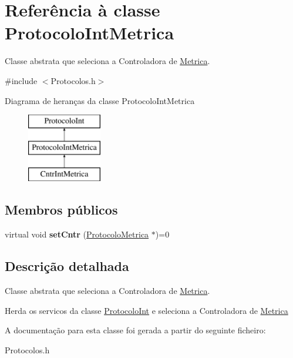 \hypertarget{class_protocolo_int_metrica}{
\section{\-Referência à classe \-Protocolo\-Int\-Metrica}
\label{class_protocolo_int_metrica}
}


\-Classe abstrata que seleciona a \-Controladora de \hyperlink{class_metrica}{\-Metrica}.  




{\ttfamily \#include $<$\-Protocolos.\-h$>$}

\-Diagrama de heranças da classe \-Protocolo\-Int\-Metrica\begin{figure}[H]
\begin{center}
\leavevmode
\includegraphics[height=3.000000cm]{class_protocolo_int_metrica}
\end{center}
\end{figure}
\subsection*{\-Membros públicos}
\begin{DoxyCompactItemize}
\item 
\hypertarget{class_protocolo_int_metrica_a554fb5978dea8a6551ef59ccc18024a8}{
virtual void {\bfseries set\-Cntr} (\hyperlink{class_protocolo_metrica}{\-Protocolo\-Metrica} $\ast$)=0}
\label{class_protocolo_int_metrica_a554fb5978dea8a6551ef59ccc18024a8}

\end{DoxyCompactItemize}


\subsection{\-Descrição detalhada}
\-Classe abstrata que seleciona a \-Controladora de \hyperlink{class_metrica}{\-Metrica}. 

\-Herda os servicos da classe \hyperlink{class_protocolo_int}{\-Protocolo\-Int} e seleciona a \-Controladora de \hyperlink{class_metrica}{\-Metrica} 

\-A documentação para esta classe foi gerada a partir do seguinte ficheiro\-:\begin{DoxyCompactItemize}
\item 
\-Protocolos.\-h\end{DoxyCompactItemize}
